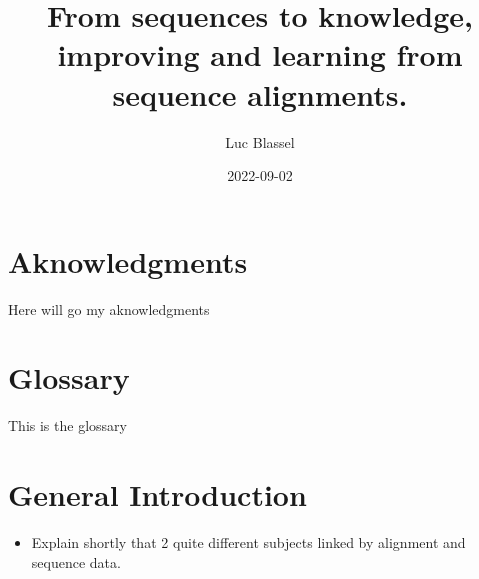 \documentclass[
  11pt,
  twoside]{scrbook}
\title{From sequences to knowledge, improving and learning from sequence alignments.}
\author{Luc Blassel}
\date{2022-09-02}
\providecommand{\tightlist}{%
  \setlength{\itemsep}{0pt}\setlength{\parskip}{0pt}}
\begin{document}
\maketitle




\pagestyle{empty}
\frontmatter

\chapter{Aknowledgments}
Here will go my aknowledgments
\lipsum[7-9]

\chapter{Glossary}
This is the glossary

\mainmatter

{
\setcounter{tocdepth}{2}
\tableofcontents
}
\listoffigures
\listoftables
\pagestyle{empty}

\pagestyle{fancy}
\fancyhf{}
\fancyhead[RO]{\rightmark}
\fancyfoot[CO,CE]{\thepage}

\hypertarget{general-introduction}{%
\chapter*{General Introduction}\label{general-introduction}}

\begin{itemize}
\tightlist
\item
  Explain shortly that 2 quite different subjects linked by alignment and sequence data.
\end{itemize}
\end{document}
